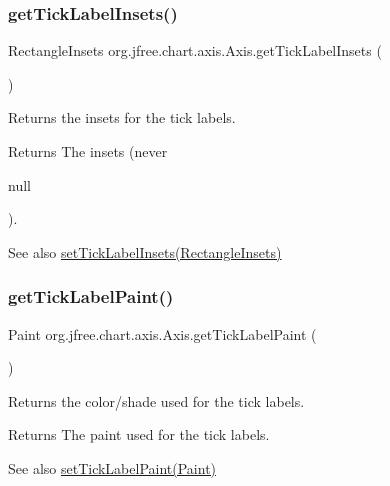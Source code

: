 \subsubsection{\texorpdfstring{get\+Tick\+Label\+Insets()}{getTickLabelInsets()}}
{\footnotesize\ttfamily Rectangle\+Insets org.\+jfree.\+chart.\+axis.\+Axis.\+get\+Tick\+Label\+Insets (\begin{DoxyParamCaption}{ }\end{DoxyParamCaption})}

Returns the insets for the tick labels.

\begin{DoxyReturn}{Returns}
The insets (never
\begin{DoxyCode}
null 
\end{DoxyCode}
 ).
\end{DoxyReturn}
\begin{DoxySeeAlso}{See also}
\mbox{\hyperlink{classorg_1_1jfree_1_1chart_1_1axis_1_1_axis_a087c1ec4d196a396c15fcaec85dfeb5b}{set\+Tick\+Label\+Insets(\+Rectangle\+Insets)}} 
\end{DoxySeeAlso}
\mbox{\label{classorg_1_1jfree_1_1chart_1_1axis_1_1_axis_a76c5c5924b56a2936b516e7fe3ab50ee}} 
\subsubsection{\texorpdfstring{get\+Tick\+Label\+Paint()}{getTickLabelPaint()}}
{\footnotesize\ttfamily Paint org.\+jfree.\+chart.\+axis.\+Axis.\+get\+Tick\+Label\+Paint (\begin{DoxyParamCaption}{ }\end{DoxyParamCaption})}

Returns the color/shade used for the tick labels.

\begin{DoxyReturn}{Returns}
The paint used for the tick labels.
\end{DoxyReturn}
\begin{DoxySeeAlso}{See also}
\mbox{\hyperlink{classorg_1_1jfree_1_1chart_1_1axis_1_1_axis_a5ce2c0a548ab9ccc1946f4495120f78a}{set\+Tick\+Label\+Paint(\+Paint)}} 
\end{DoxySeeAlso}
\mbox{\label{classorg_1_1jfree_1_1chart_1_1axis_1_1_axis_a6148f15b99e9ba54ac3a3793e16e3110}} 
